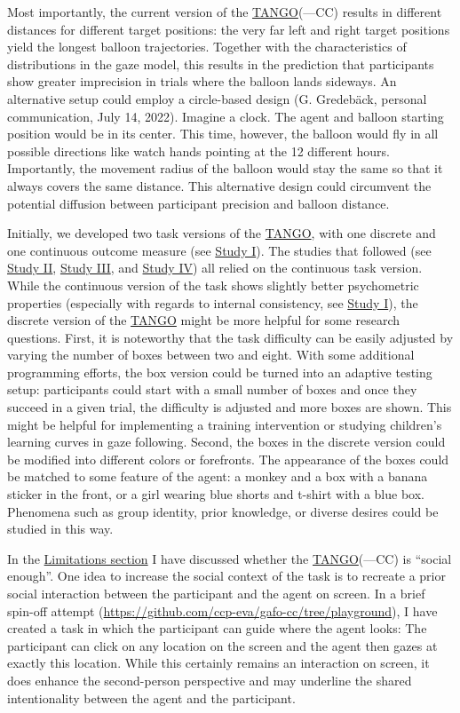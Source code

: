 \documentclass[
]{scrbook}
\begin{document}
Most importantly, the current version of the \hyperref[acronyms_TANGO]{TANGO}(---CC) results in different distances for different target positions: the very far left and right target positions yield the longest balloon trajectories. Together with the characteristics of distributions in the gaze model, this results in the prediction that participants show greater imprecision in trials where the balloon lands sideways. An alternative setup could employ a circle-based design (G. Gredebäck, personal communication, July 14, 2022). Imagine a clock. The agent and balloon starting position would be in its center. This time, however, the balloon would fly in all possible directions like watch hands pointing at the 12 different hours. Importantly, the movement radius of the balloon would stay the same so that it always covers the same distance. This alternative design could circumvent the potential diffusion between participant precision and balloon distance.

Initially, we developed two task versions of the \hyperref[acronyms_TANGO]{TANGO}, with one discrete and one continuous outcome measure (see \hyperref[studyI]{Study I}). The studies that followed (see \hyperref[studyII]{Study II}, \hyperref[studyIII]{Study III}, and \hyperref[studyIV]{Study IV}) all relied on the continuous task version. While the continuous version of the task shows slightly better psychometric properties (especially with regards to internal consistency, see \hyperref[studyI]{Study I}), the discrete version of the \hyperref[acronyms_TANGO]{TANGO} might be more helpful for some research questions. First, it is noteworthy that the task difficulty can be easily adjusted by varying the number of boxes between two and eight. With some additional programming efforts, the box version could be turned into an adaptive testing setup: participants could start with a small number of boxes and once they succeed in a given trial, the difficulty is adjusted and more boxes are shown. This might be helpful for implementing a training intervention or studying children's learning curves in gaze following. Second, the boxes in the discrete version could be modified into different colors or forefronts. The appearance of the boxes could be matched to some feature of the agent: a monkey and a box with a banana sticker in the front, or a girl wearing blue shorts and t-shirt with a blue box. Phenomena such as group identity, prior knowledge, or diverse desires could be studied in this way.

In the \hyperref[limitations]{Limitations section} I have discussed whether the \hyperref[acronyms_TANGO]{TANGO}(---CC) is ``social enough''. One idea to increase the social context of the task is to recreate a prior social interaction between the participant and the agent on screen. In a brief spin-off attempt (\mbox{\url{https://github.com/ccp-eva/gafo-cc/tree/playground}}), I have created a task in which the participant can guide where the agent looks: The participant can click on any location on the screen and the agent then gazes at exactly this location. While this certainly remains an interaction on screen, it does enhance the second-person perspective and may underline the shared intentionality between the agent and the participant.
\end{document}

